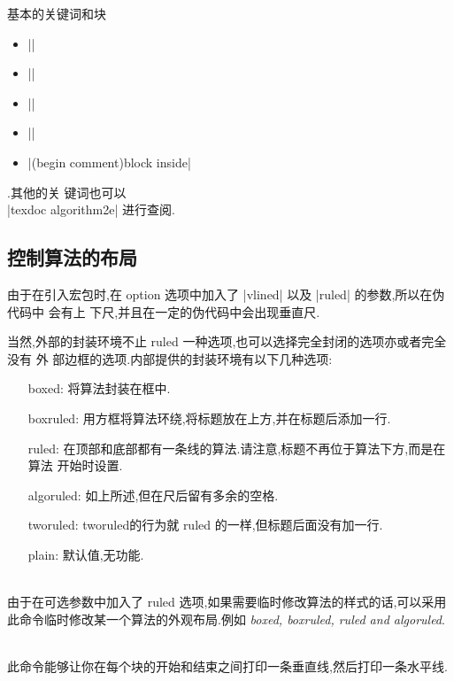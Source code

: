  	\noindent 基本的关键词和块
 	\begin{itemize}
 		\item |\KwTo|
 		\item |\KwRet{[value]}|
 		\item |\Return{[value]}|
 	\end{itemize} 
 	\begin{itemize}
 		\item ||
 		\item |\Begin(begin comment){block inside}|
 	\end{itemize}
 	.其他的关
 	键词也可以 \\ |texdoc algorithm2e| 进行查阅.
 
\subsection{控制算法的布局}
	\par 由于在引入宏包时,在 option 选项中加入了 |vlined| 以及 |ruled| 的参数,所以在伪代码中
	会有上
	下尺,并且在一定的伪代码中会出现垂直尺.
	\par  当然,外部的封装环境不止 ruled 一种选项,也可以选择完全封闭的选项亦或者完全没有
	外
	部边框的选项.内部提供的封装环境有以下几种选项:
	\begin{itemize}
		\item[boxed:] 将算法封装在框中.
		\item[boxruled:] 用方框将算法环绕,将标题放在上方,并在标题后添加一行.
		\item[ruled:] 在顶部和底部都有一条线的算法.请注意,标题不再位于算法下方,而是在算法
		开始时设置.
		\item[algoruled:] 如上所述,但在尺后留有多余的空格.
		\item[tworuled:] tworuled的行为就 ruled 的一样,但标题后面没有加一行.
		\item[plain:] 默认值,无功能.
	\end{itemize}
	
	
	\noindent \cprotect {} \\
由于在可选参数中加入了 ruled 选项,如果需要临时修改算法的样式的话,可以采用此命令临时修改某一个算法的外观布局.例如 \textit{boxed, boxruled, ruled and algoruled}.

\noindent \cprotect \fbox{|\SetAlgoVlined |} \\
此命令能够让你在每个块的开始和结束之间打印一条垂直线,然后打印一条水平线.

